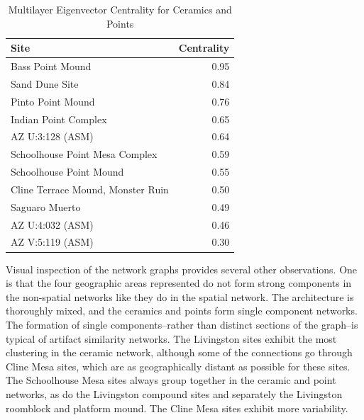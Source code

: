\documentclass[]{interact}
\theoremstyle{plain}%
\theoremstyle{definition}
\theoremstyle{remark}
\begin{document}
\begin{table}

\caption{\label{tab:meanEigen}Multilayer Eigenvector Centrality for Ceramics and Points}
\centering
\begin{tabular}[t]{lr}
\toprule
Site & Centrality\\
\midrule
Bass Point Mound & 0.95\\
Sand Dune Site & 0.84\\
Pinto Point Mound & 0.76\\
Indian Point Complex & 0.65\\
AZ U:3:128 (ASM) & 0.64\\
\addlinespace
Schoolhouse Point Mesa Complex & 0.59\\
Schoolhouse Point Mound & 0.55\\
Cline Terrace Mound, Monster Ruin & 0.50\\
Saguaro Muerto & 0.49\\
AZ U:4:032 (ASM) & 0.46\\
\addlinespace
AZ V:5:119 (ASM) & 0.30\\
\bottomrule
\end{tabular}
\end{table}

Visual inspection of the network graphs provides several other
observations. One is that the four geographic areas represented do not
form strong components in the non-spatial networks like they do in the
spatial network. The architecture is thoroughly mixed, and the ceramics
and points form single component networks. The formation of single
components--rather than distinct sections of the graph--is typical of
artifact similarity networks. The Livingston sites exhibit the most
clustering in the ceramic network, although some of the connections go
through Cline Mesa sites, which are as geographically distant as
possible for these sites. The Schoolhouse Mesa sites always group
together in the ceramic and point networks, as do the Livingston
compound sites and separately the Livingston roomblock and platform
mound. The Cline Mesa sites exhibit more variability.
\end{document}
